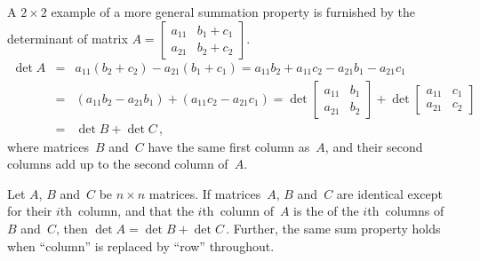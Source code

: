 \begin{example} \label{eg:cpdet2}
A \(2\times2\) example of a more general summation property is furnished by the determinant of matrix \(A=\begin{bmatrix} a_{11}&b_1+c_1\\a_{21}&b_2+c_2 \end{bmatrix}\).
\begin{eqnarray*}
\det A&=&a_{11}(b_2+c_2)-a_{21}(b_1+c_1)
=a_{11}b_2+a_{11}c_2-a_{21}b_1-a_{21}c_1
\\&=&(a_{11}b_2-a_{21}b_1)+(a_{11}c_2-a_{21}c_1)
=\det\begin{bmatrix} a_{11}&b_1\\a_{21}&b_2 \end{bmatrix}
+\det\begin{bmatrix} a_{11}&c_1\\a_{21}&c_2 \end{bmatrix}
\\&=&\det B+\det C\,,
\end{eqnarray*}
where matrices~\(B\) and~\(C\) have the same first column as~\(A\), and their second columns add up to the second column of~\(A\).
\end{example}





\begin{theorem} \label{thm:rpdet:v} 
Let \(A\), \(B\) and~\(C\) be \(n\times n\) matrices.
If matrices~\(A\), \(B\) and~\(C\) are identical except for their \(i\)th~column, and that the \(i\)th~column of~\(A\) is the  of the \(i\)th~columns of \(B\) and~\(C\), then \(\det A=\det B+\det C\)\,.
Further, the same sum property holds when ``column'' is replaced by ``row'' throughout.
\end{theorem}


